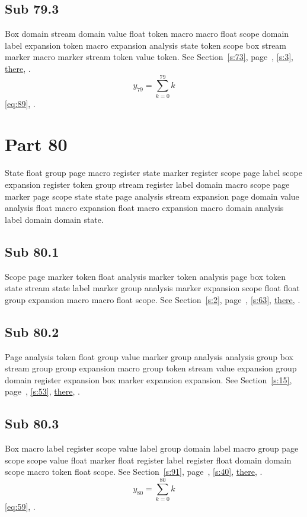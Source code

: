\documentclass[11pt]{article}
\begin{document}
\subsection{Sub 79.3}\label{ss:79.3} Box domain stream domain value float token macro macro float scope domain label expansion token macro expansion analysis state token scope box stream marker macro marker stream token value token. See Section~\ref{s:73}, page~\pageref{ss:21.1}, \cref{s:3}, \hyperref[s:51]{there}, \cite{k27,k48}.
\begin{equation}y_{79}=\sum_{k=0}^{79}k\label{eq:79}\end{equation} \eqref{eq:89}, .
\section{Part 80}\label{s:80}
State float group page macro register state marker register scope page label scope expansion register token group stream register label domain macro scope page marker page scope state state page analysis stream expansion page domain value analysis float macro expansion float macro expansion macro domain analysis label domain domain state.
\subsection{Sub 80.1}\label{ss:80.1} Scope page marker token float analysis marker token analysis page box token state stream state label marker group analysis marker expansion scope float float group expansion macro macro float scope. See Section~\ref{s:2}, page~\pageref{ss:98.1}, \cref{s:63}, \hyperref[s:87]{there}, \cite{k52,k39}.
\subsection{Sub 80.2}\label{ss:80.2} Page analysis token float group value marker group analysis analysis group box stream group group expansion macro group token stream value expansion group domain register expansion box marker expansion expansion. See Section~\ref{s:15}, page~\pageref{ss:15.3}, \cref{s:53}, \hyperref[s:45]{there}, \cite{k59,k84}.
\subsection{Sub 80.3}\label{ss:80.3} Box macro label register scope value label group domain label macro group page scope scope value float marker float register label register float domain domain scope macro token float scope. See Section~\ref{s:91}, page~\pageref{ss:78.2}, \cref{s:40}, \hyperref[s:13]{there}, \cite{k106,k7}.
\begin{equation}y_{80}=\sum_{k=0}^{80}k\label{eq:80}\end{equation} \eqref{eq:59}, .
\end{document}
